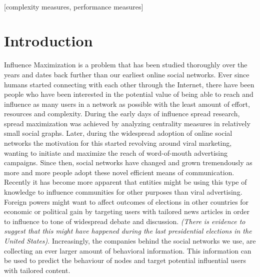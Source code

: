 \documentclass{acm_proc_article-sp}
\begin{document}
 \\
[complexity measures, performance measures]



\section{Introduction}
Influence Maximization is a problem that has been studied thoroughly over the years and dates back further than our earliest online social networks. Ever since humans started connecting with each other through the Internet, there have been people who have been interested in the potential value of being able to reach and influence as many users in a network as possible with the least amount of effort, resources and complexity. During the early days of influence spread research, spread maximization was achieved by analyzing centrality measures in relatively small social graphs. Later, during the widespread adoption of online social networks the motivation for this started revolving around viral marketing, wanting to initiate and maximize the reach of word-of-mouth advertising campaigns. Since then, social networks have changed and grown tremendously as more and more people adopt these novel efficient means of communication. Recently it has become more apparent that entities might be using this type of knowledge to influence communities for other purposes than viral advertising. Foreign powers might want to affect outcomes of elections in other countries for economic or political gain by targeting users with tailored news articles in order to influence to tone of widespread debate and discussion. \textit{(There is evidence to suggest that this might have happened during the last presidential elections in the United States)}. Increasingly, the companies behind the social networks we use, are collecting an ever larger amount of behavioral information. This information can be used to predict the behaviour of nodes and target potential influential users with tailored content.
\end{document}

